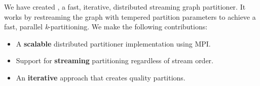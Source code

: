 We have created \ourmethod, a fast, iterative, distributed streaming graph partitioner.
It works by restreaming the graph with tempered partition parameters to achieve a fast, parallel \textit{k}-partitioning.
We make the following contributions:
\begin{itemize}
\item A \textbf{scalable} distributed partitioner implementation using MPI.
\item Support for \textbf{streaming} partitioning regardless of stream order.
\item An \textbf{iterative} approach that creates quality partitions.
\end{itemize}



